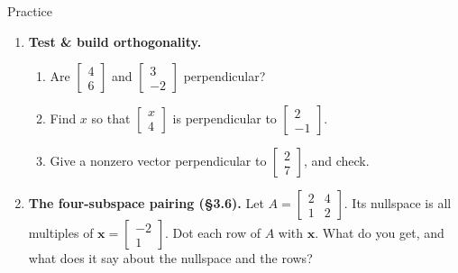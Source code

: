 \documentclass[10pt]{article}
\newcommand{\vv}{\mathbf{v}}
\newcommand{\xx}{\mathbf{x}}
\begin{document}
\begin{notesbox}{Practice}
\begin{enumerate}[leftmargin=1.9em, itemsep=12pt]
\begin{enumerate}[label=(\alph*), leftmargin=1.8em, itemsep=4pt]
      \item $\vv=\begin{bmatrix} 0 \\ 7 \end{bmatrix}$ \hfill \ans{$\|\vv\|=7$; unit $\begin{bsmallmatrix} 0\\1 \end{bsmallmatrix}$}
    \end{enumerate}
  \item \textbf{Test \& build orthogonality.}
    \begin{enumerate}[label=(\alph*), leftmargin=1.8em, itemsep=6pt]
      \item Are $\begin{bmatrix} 4 \\ 6 \end{bmatrix}$ and $\begin{bmatrix} 3 \\ -2 \end{bmatrix}$ perpendicular? \quad {}
      \item Find $x$ so that $\begin{bmatrix} x \\ 4 \end{bmatrix}$ is perpendicular to $\begin{bmatrix} 2 \\ -1 \end{bmatrix}$. \quad {}
      \item Give a nonzero vector perpendicular to $\begin{bmatrix} 2 \\ 7 \end{bmatrix}$, and check. \quad {}
    \end{enumerate}
  \item \textbf{The four-subspace pairing (§3.6).} Let $A=\begin{bmatrix} 2 & 4 \\ 1 & 2 \end{bmatrix}$.
        Its nullspace is all multiples of $\xx=\begin{bmatrix} -2 \\ 1 \end{bmatrix}$. Dot each row of
        $A$ with $\xx$. What do you get, and what does it say about the nullspace and the rows?

\end{enumerate}
\end{notesbox}
\end{document}
